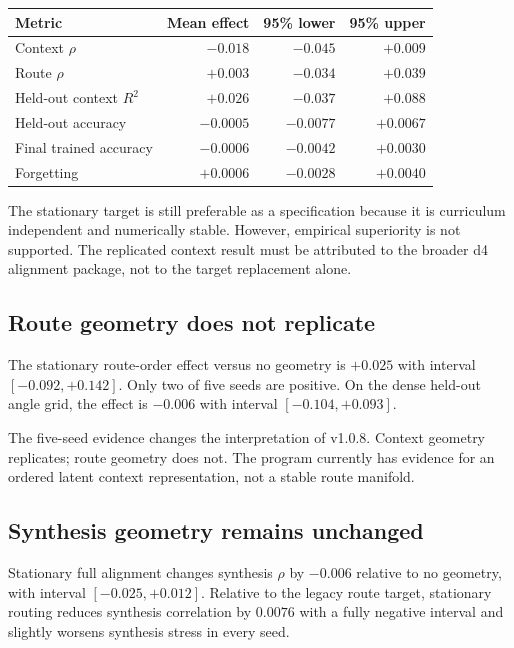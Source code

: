 \documentclass[11pt,a4paper]{article}
\begin{document}
\begin{center}
\begin{tabular}{lrrr}
\toprule
Metric & Mean effect & 95\% lower & 95\% upper \\
\midrule
Context $\rho$ & $-0.018$ & $-0.045$ & $+0.009$ \\
Route $\rho$ & $+0.003$ & $-0.034$ & $+0.039$ \\
Held-out context $R^2$ & $+0.026$ & $-0.037$ & $+0.088$ \\
Held-out accuracy & $-0.0005$ & $-0.0077$ & $+0.0067$ \\
Final trained accuracy & $-0.0006$ & $-0.0042$ & $+0.0030$ \\
Forgetting & $+0.0006$ & $-0.0028$ & $+0.0040$ \\
\bottomrule
\end{tabular}
\end{center}

The stationary target is still preferable as a specification because it is curriculum independent and numerically stable. However, empirical superiority is not supported. The replicated context result must be attributed to the broader d4 alignment package, not to the target replacement alone.

\subsection{Route geometry does not replicate}

The stationary route-order effect versus no geometry is $+0.025$ with interval $[-0.092,+0.142]$. Only two of five seeds are positive. On the dense held-out angle grid, the effect is $-0.006$ with interval $[-0.104,+0.093]$.

\begin{warningbox}
The five-seed evidence changes the interpretation of v1.0.8. Context geometry replicates; route geometry does not. The program currently has evidence for an ordered latent context representation, not a stable route manifold.
\end{warningbox}

\subsection{Synthesis geometry remains unchanged}

Stationary full alignment changes synthesis $\rho$ by $-0.006$ relative to no geometry, with interval $[-0.025,+0.012]$. Relative to the legacy route target, stationary routing reduces synthesis correlation by $0.0076$ with a fully negative interval and slightly worsens synthesis stress in every seed.
\end{document}
